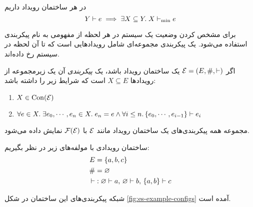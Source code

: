 \begin{proposition}
  در هر ساختمان رویداد داریم
  \begin{equation*}
    Y \vdash e \implies
    \exists X \subseteq Y.\;X \vdash_{\min} e
  \end{equation*}
\end{proposition}

برای مشخص کردن وضعیت یک سیستم در هر لحظه
از مفهومی به نام پیکر‌بندی
استفاده می‌شود. یک پیکربندی
مجموعه‌ای شامل رویدادهایی است که تا آن لحظه در سیستم رخ داده‌اند.

\begin{definition}\label{def:configuration}
  اگر
  $\mathcal{E} = (E,\#,\vdash)$
  یک ساختمان رویداد باشد، یک
  \textit{پیکربندی}
  آن یک زیرمجموعه از رویداد‌ها
  $X \subseteq E$
  است که شرایط زیر را داشته باشد:
  \begin{enumerate}
      \item $X \in \operatorname{Con}(\mathcal{E})$
      \item $
        \forall e \in X.\;
        \exists e_0, \cdots, e_n \in X.\;
        e_n = e \wedge
        \forall i \leq n. \left\{ e_0, \cdots, e_{i-1} \right\} \vdash e_i
      $
  \end{enumerate}
\end{definition}

مجموعه همه پیکربندی‌های یک ساختمان رویداد مانند
$\mathcal{E}$
با
$\operatorname{\mathcal{F}}(\mathcal{E})$
نمایش داده می‌شود.

\begin{example}\label{ex:event-structure}
  ساختمان رویدادی با مولفه‌های زیر در نظر بگیریم:
  \begin{align*}
    E & = \left\{ a, b, c \right\} \\
    \# & = \varnothing \\
    \vdash & :
      \varnothing \vdash a,\,
      \varnothing \vdash b,\,
      \left\{ a,b \right\} \vdash c
  \end{align*}

  شبکه پیکربندی‌های این ساختمان در شکل
  \ref{fig:es-example-configs}
  آمده است.

  
\end{example}